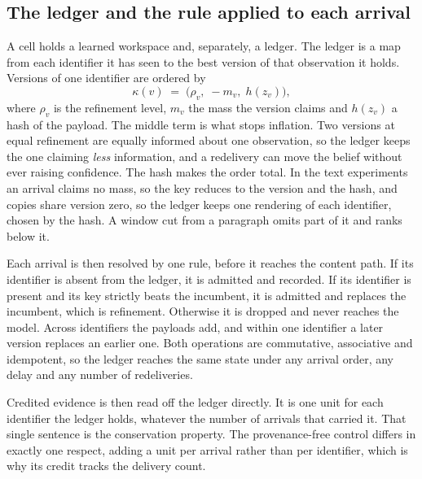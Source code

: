 \documentclass{article}
\begin{document}
\subsection{The ledger and the rule applied to each arrival}
\label{sec:joins}
A cell holds a learned workspace and, separately, a ledger. The ledger is a map
from each identifier it has seen to the best version of that observation it
holds. Versions of one identifier are ordered by
\begin{equation}
\kappa(v) \;=\; \bigl(\rho_v,\; -m_v,\; h(z_v)\bigr),
\label{eq:kappa}
\end{equation}
where $\rho_v$ is the refinement level, $m_v$ the mass the version claims and
$h(z_v)$ a hash of the payload. The middle term is what stops inflation. Two
versions at equal refinement are equally informed about one observation, so the
ledger keeps the one claiming \emph{less} information, and a redelivery can move
the belief without ever raising confidence. The hash makes the order total. In
the text experiments an arrival claims no mass, so the key reduces to the version
and the hash, and copies share version zero, so the ledger keeps one
rendering of each identifier, chosen by the hash. A window cut from a paragraph
omits part of it and ranks below it.

Each arrival is then resolved by one rule, before it reaches the content path.
If its identifier is absent from the ledger, it is admitted and recorded. If its
identifier is present and its key strictly beats the incumbent, it is admitted
and replaces the incumbent, which is refinement. Otherwise it is dropped and
never reaches the model. Across identifiers the payloads add, and within one
identifier a later version replaces an earlier one. Both operations are
commutative, associative and idempotent, so the ledger reaches the same state
under any arrival order, any delay and any number of redeliveries.

Credited evidence is then read off the ledger directly. It is one unit for each
identifier the ledger holds, whatever the number of arrivals that carried it.
That single sentence is the conservation property. The provenance-free control
differs in exactly one respect, adding a unit per arrival rather than per
identifier, which is why its credit tracks the delivery count.
\end{document}
